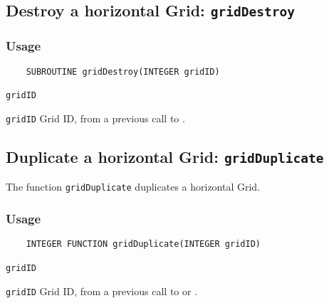 \subsection{Destroy a horizontal Grid: \texttt{gridDestroy}}
\label{gridDestroy}
\subsubsection*{Usage}

\begin{verbatim}
    SUBROUTINE gridDestroy(INTEGER gridID)
\end{verbatim}

\hspace*{4mm}\begin{minipage}[]{15cm}
\begin{deflist}{\texttt{gridID}\ }
\item[\texttt{gridID}]
Grid ID, from a previous call to {}.

\end{deflist}
\end{minipage}


\subsection{Duplicate a horizontal Grid: \texttt{gridDuplicate}}
\label{gridDuplicate}

The function {\texttt{gridDuplicate}} duplicates a horizontal Grid.

\subsubsection*{Usage}

\begin{verbatim}
    INTEGER FUNCTION gridDuplicate(INTEGER gridID)
\end{verbatim}

\hspace*{4mm}\begin{minipage}[]{15cm}
\begin{deflist}{\texttt{gridID}\ }
\item[\texttt{gridID}]
Grid ID, from a previous call to {} or {}.

\end{deflist}
\end{minipage}

